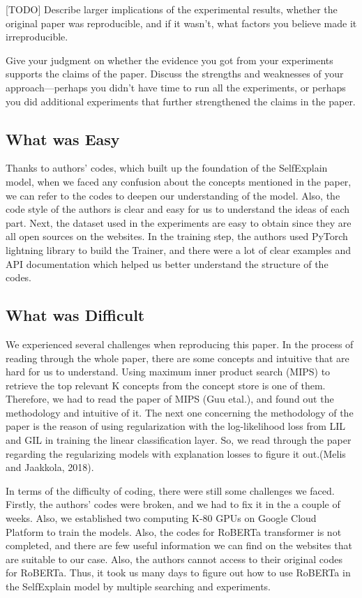 \documentclass{article}
\begin{document}
[TODO] Describe larger implications of the experimental results, whether the original paper was reproducible, and if it wasn’t, what factors you believe made it irreproducible. 

Give your judgment on whether  the evidence you got from your experiments supports the claims of the paper. Discuss the strengths and weaknesses of your approach---perhaps you didn't have time to run all the experiments, or perhaps you did additional experiments that further strengthened the claims in the paper.

\subsection{What was Easy}

Thanks to authors' codes, which built up the foundation of the SelfExplain model, when we faced any confusion about the concepts mentioned in the paper, we can refer to the codes to deepen our understanding of the model. Also, the code style of the authors is clear and easy for us to understand the ideas of each part. Next, the dataset used in the experiments are easy to obtain since they are all open sources on the websites. In the training step, the authors used PyTorch lightning library to build the Trainer, and there were a lot of clear examples and API documentation which helped us better understand the structure of the codes.  

\subsection{What was Difficult}

We experienced several challenges when reproducing this paper. In the process of reading through the whole paper, there are some concepts and intuitive that are hard for us to understand. Using maximum inner product search (MIPS) to retrieve the top relevant K concepts from the concept store is one of them. Therefore, we had to read the paper of MIPS (Guu etal.), and found out the methodology and intuitive of it. The next one concerning the methodology of the paper is the reason of using regularization with the log-likelihood loss from LIL and GIL in training the linear classification layer. So, we read through the paper regarding the regularizing models with explanation losses to figure it out.(Melis and Jaakkola, 2018). 

In terms of the difficulty of coding, there were still some challenges we faced. Firstly, the authors' codes were broken, and we had to fix it in the a couple of weeks. Also, we established two computing K-80 GPUs on Google Cloud Platform to train the models. Also, the codes for RoBERTa transformer is not completed, and there are few useful information we can find on the websites that are suitable to our case. Also, the authors cannot access to their original codes for RoBERTa. Thus, it took us many days to figure out how to use RoBERTa in the SelfExplain model by multiple searching and experiments.\\ 
\end{document}
